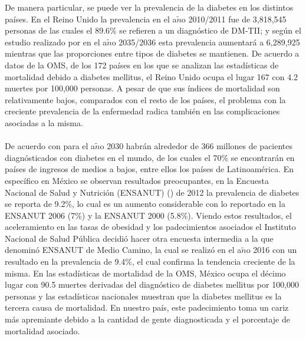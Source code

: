 De manera particular, se puede ver la prevalencia de la diabetes en los distintos pa\'ises. En el Reino Unido la prevalencia en el a$\tilde{n}$o 2010/2011 fue de 3,818,545 personas de las cuales el 89.6\% se refieren a un diagn\'ostico de DM-TII; y seg\'un el estudio realizado por \cite{hex2012estimating} en el a$\tilde{n}$o 2035/2036 esta prevalencia aumentar\'a a 6,289,925 mientras que las proporciones entre tipos de diabetes se mantienen. De acuerdo a datos de la OMS, de los 172 pa\'ises en los que se analizan las estad\'isticas de mortalidad debido a diabetes mellitus, el Reino Unido ocupa el lugar 167 con 4.2 muertes por 100,000 personas. A pesar de que sus \'indices de mortalidad son relativamente bajos, comparados con el resto de los pa\'ises, el problema con la creciente prevalencia de la enfermedad radica tambi\'en en las complicaciones asociadas a la misma.\\
\\
De acuerdo con \cite{bolanos2010costos} para el a$\tilde{n}$o 2030 habr\'an alrededor de 366 millones de pacientes diagn\'osticados con diabetes en el mundo, de los cuales el 70\% se encontrar\'an en pa\'ises de ingresos de medios a bajos, entre ellos los pa\'ises de Latinoam\'erica. En espec\'ifico en M\'exico se observan resultados preocupantes, en la Encuesta Nacional de Salud y Nutrici\'on (ENSANUT) (\cite{gutierrezencuesta}) de 2012 la prevalencia de diabetes se reporta de 9.2\%, lo cual es un aumento considerable con lo reportado en la ENSANUT 2006 (7\%) y la ENSANUT 2000 (5.8\%). Viendo estos resultados, el aceleramiento en las tasas de obesidad y los padecimientos asociados el Instituto Nacional de Salud P\'ublica decidi\'o hacer otra encuesta intermedia a la que denomin\'o ENSANUT de Medio Camino, la cual se realiz\'o en el a$\tilde{n}$o 2016 con un resultado en la prevalencia de 9.4\%, el cual confirma la tendencia creciente de la misma. En las estad\'isticas de mortalidad de la OMS, M\'exico ocupa el d\'ecimo lugar con 90.5 muertes derivadas del diagn\'ostico de diabetes mellitus por 100,000 personas y las estad\'isticas nacionales muestran que la diabetes mellitus es la tercera causa de mortalidad. En nuestro pa\'is, este padecimiento toma un cariz m\'as apremiante debido a la cantidad de gente diagnosticada y el porcentaje de mortalidad asociado.\\
\\
